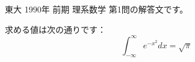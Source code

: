 \documentclass{article}
\begin{document}
東大 1990年 前期 理系数学 第1問の解答文です。

求める値は次の通りです：
\[
\int_{-\infty}^{\infty} e^{-x^2} dx = \sqrt{\pi}
\]
\end{document}
